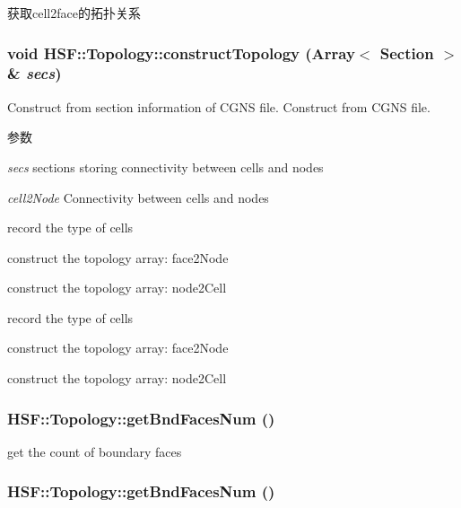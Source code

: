 获取cell2face的拓扑关系 \hypertarget{classHSF_1_1Topology_a95c9a7e1275aa1024ea624c3a2097f27}{
\subsubsection[{constructTopology}]{\setlength{\rightskip}{0pt plus 5cm}void HSF::Topology::constructTopology (Array$<$ {\bf Section} $>$ \& {\em secs})}}
\label{classHSF_1_1Topology_a95c9a7e1275aa1024ea624c3a2097f27}


Construct from section information of CGNS file. Construct from CGNS file.


\begin{DoxyParams}{参数}
\item[{\em secs}]sections storing connectivity between cells and nodes\item[{\em cell2Node}]Connectivity between cells and nodes \end{DoxyParams}


record the type of cells

construct the topology array: face2Node

construct the topology array: node2Cell

record the type of cells

construct the topology array: face2Node

construct the topology array: node2Cell \hypertarget{classHSF_1_1Topology_a14bba9407c2c026f94acbd9915bfa2a0}{
\subsubsection[{getBndFacesNum}]{ HSF::Topology::getBndFacesNum ()}}
\label{classHSF_1_1Topology_a14bba9407c2c026f94acbd9915bfa2a0}


get the count of boundary faces \hypertarget{classHSF_1_1Topology_a14bba9407c2c026f94acbd9915bfa2a0}{
\subsubsection[{getBndFacesNum}]{ HSF::Topology::getBndFacesNum ()}}
\label{classHSF_1_1Topology_a14bba9407c2c026f94acbd9915bfa2a0}


